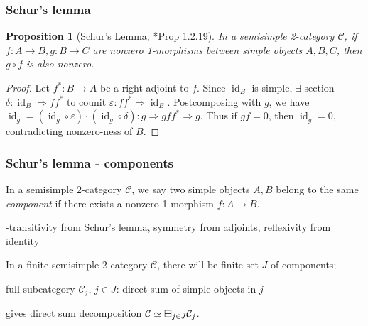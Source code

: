 \documentclass{beamer}
\newcommand{\veps}{{\varepsilon}}
\DeclareMathOperator{\id}{id}
\newtheorem{proposition}[theorem]{Proposition}
\newcommand{\cC}{{\mathcal{C}}}
\newcommand{\bigboxplus}{\Huge \boxplus}
\begin{document}
\begin{frame}
\frametitle{Schur's lemma}

\begin{proposition}
[Schur's Lemma, \cite{DRfusion}*{Prop 1.2.19}]
\label{p:schur-lemma}
In a semisimple 2-category $\cC$,
if $f: A \to B, g: B \to C$ are nonzero 1-morphisms
between simple objects $A,B,C$,
then $g \circ f$ is also nonzero.
\end{proposition}

\pause

\begin{proof}


\pause
Let $f^*: B \to A$ be a right adjoint to $f$.
\pause
Since $\id_B$ is simple, $\exists$ section
$\delta: \id_B \Rightarrow ff^*$
to counit $\veps: ff^* \Rightarrow \id_B$.
\pause
Postcomposing with $g$,
we have $\id_g = (\id_g \circ \veps) \cdot (\id_g \circ \delta):
g \Rightarrow gff^* \Rightarrow g$.
\pause
Thus if $gf = 0$, then $\id_g = 0$,
contradicting nonzero-ness of $B$.
\end{proof}

\end{frame}

\begin{frame}
\frametitle{Schur's lemma - components}


\begin{definition}
In a semisimple 2-category $\cC$,
we say two simple objects $A,B$ belong to the same
\emph{component} if there exists a nonzero 1-morphism
$f: A \to B$.
\end{definition}

\pause

-transitivity from Schur's lemma, symmetry from adjoints,
reflexivity from identity

\pause

In a finite semisimple 2-category $\cC$,
there will be finite set $J$ of components;

\pause

full subcategory $\cC_j$, $j \in J$:
direct sum of simple objects in $j$

\pause

gives direct sum decomposition
$\cC \simeq \bigboxplus_{j \in J} \cC_j$.

\end{frame}
\end{document}
